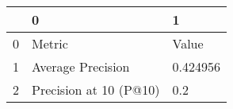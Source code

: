 \begin{tabular}{lll}
\toprule
{} &                       0 &         1 \\
\midrule
0 &                  Metric &     Value \\
1 &       Average Precision &  0.424956 \\
2 &  Precision at 10 (P@10) &       0.2 \\
\bottomrule
\end{tabular}
